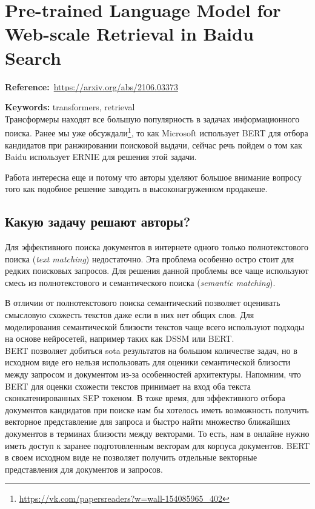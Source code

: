 \chapter{Pre-trained Language Model for Web-scale Retrieval in Baidu Search}

\textbf{Reference:}~\url{https://arxiv.org/abs/2106.03373}

\textbf{Keywords:} transformers, retrieval \\

Трансформеры находят все большую популярность в задачах информационного поиска.
Ранее мы уже обсуждали\footnote{\url{https://vk.com/papersreaders?w=wall-154085965_402}}, то как Microsoft использует BERT для отбора кандидатов при ранжировании поисковой выдачи, сейчас речь пойдем о том как Baidu использует ERNIE для решения этой задачи.

Работа интересна еще и потому что авторы уделяют большое внимание вопросу того как подобное решение заводить в высоконагруженном продакеше.

\section*{Какую задачу решают авторы?}

Для эффективного поиска документов в интернете одного только полнотекстового поиска (\textit{text matching}) недостаточно. Эта проблема особенно остро стоит для редких поисковых запросов. 
Для решения данной проблемы все чаще используют смесь из полнотекстового и семантического поиска (\textit{semantic matching}).

В отличии от полнотекстового поиска семантический позволяет оценивать смысловую схожесть текстов даже если в них нет общих слов.
Для моделирования семантической близости текстов чаще всего используют подходы на основе нейросетей, например таких как DSSM или BERT. \\

BERT позволяет добиться sota результатов на большом количестве задач, но в исходном виде его нельзя использовать для оценики семантической близости между запросом и документом из-за особенностей архитектуры.
Напомним, что BERT для оценки схожести текстов принимает на вход оба текста сконкатенированных SEP токеном. 
В тоже время, для эффективного отбора документов кандидатов при поиске нам бы хотелось иметь возможность получить векторное представление для запроса и быстро найти множество ближайших документов в терминах близости между векторами. 
То есть, нам в онлайне нужно иметь доступ к заранее подготовленным векторам для корпуса документов.
BERT в своем исходном виде не позволяет получить отдельные векторные представления для документов и запросов. \\

